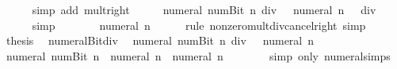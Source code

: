 \begin{isabellebody}
\ \ \ \ \isamarkupfalse%
\ {\isacharparenleft}{\kern0pt}simp\ add{\isacharcolon}{\kern0pt}\ mult{\isacharunderscore}{\kern0pt}{}{\isacharunderscore}{\kern0pt}right{\isacharparenright}{\kern0pt}\isanewline
\ \ \isamarkupfalse%
\ \isamarkupfalse%
\ {\isachardoublequoteopen}numeral\ {\isacharparenleft}{\kern0pt}num{\isachardot}{\kern0pt}Bit{}\ n{\isacharparenright}{\kern0pt}\ div\ {}\ {\isacharequal}{\kern0pt}\ numeral\ n\ {\isacharasterisk}{\kern0pt}\ {}\ div\ {}{\isachardoublequoteclose}\isanewline
\ \ \ \ \isamarkupfalse%
\ simp\isanewline
\ \ \isamarkupfalse%
\ \isamarkupfalse%
\ {\isachardoublequoteopen}{\isasymdots}\ {\isacharequal}{\kern0pt}\ numeral\ n{\isachardoublequoteclose}\isanewline
\ \ \ \ \isamarkupfalse%
\ {\isacharparenleft}{\kern0pt}rule\ nonzero{\isacharunderscore}{\kern0pt}mult{\isacharunderscore}{\kern0pt}div{\isacharunderscore}{\kern0pt}cancel{\isacharunderscore}{\kern0pt}right{\isacharparenright}{\kern0pt}\ simp\isanewline
\ \ \isamarkupfalse%
\ \isamarkupfalse%
\ {\isacharquery}{\kern0pt}thesis\ \isacommand{{\isachardot}{\kern0pt}}\isamarkupfalse%
\isanewline
{}\isamarkupfalse%
%
\endisatagproof
{\isafoldproof}%
%
\isadelimproof
\isanewline
%
\endisadelimproof
\isanewline
{}\isamarkupfalse%
\ numeral{\isacharunderscore}{\kern0pt}Bit{}{\isacharunderscore}{\kern0pt}div{\isacharunderscore}{\kern0pt}{}{\isacharcolon}{\kern0pt}\isanewline
\ \ {\isachardoublequoteopen}numeral\ {\isacharparenleft}{\kern0pt}num{\isachardot}{\kern0pt}Bit{}\ n{\isacharparenright}{\kern0pt}\ div\ {}\ {\isacharequal}{\kern0pt}\ numeral\ n{\isachardoublequoteclose}\isanewline
%
\isadelimproof
%
\endisadelimproof
%
\isatagproof
{}\isamarkupfalse%
\ {\isacharminus}{\kern0pt}\isanewline
\ \ \isamarkupfalse%
\ {\isachardoublequoteopen}numeral\ {\isacharparenleft}{\kern0pt}num{\isachardot}{\kern0pt}Bit{}\ n{\isacharparenright}{\kern0pt}\ {\isacharequal}{\kern0pt}\ numeral\ n\ {\isacharplus}{\kern0pt}\ numeral\ n\ {\isacharplus}{\kern0pt}\ {}{\isachardoublequoteclose}\isanewline
\ \ \ \ \isamarkupfalse%
\ {\isacharparenleft}{\kern0pt}simp\ only{\isacharcolon}{\kern0pt}\ numeral{\isachardot}{\kern0pt}simps{\isacharparenright}{\kern0pt}\isanewline
\ \ \isamarkupfalse%
\ \isamarkupfalse%

\end{isabellebody}

